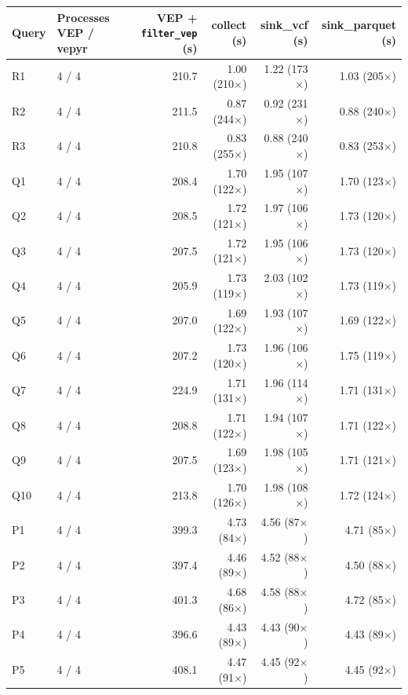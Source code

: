 \begin{tabular}{llrrrr}
\toprule
Query & Processes VEP / vepyr & VEP + \texttt{filter\_vep} (s) & collect (s) & sink\_vcf (s) & sink\_parquet (s) \\
\midrule
R1 & 4 / 4 & 210.7 & 1.00 (210$\times$) & 1.22 (173$\times$) & 1.03 (205$\times$) \\
R2 & 4 / 4 & 211.5 & 0.87 (244$\times$) & 0.92 (231$\times$) & 0.88 (240$\times$) \\
R3 & 4 / 4 & 210.8 & 0.83 (255$\times$) & 0.88 (240$\times$) & 0.83 (253$\times$) \\
Q1 & 4 / 4 & 208.4 & 1.70 (122$\times$) & 1.95 (107$\times$) & 1.70 (123$\times$) \\
Q2 & 4 / 4 & 208.5 & 1.72 (121$\times$) & 1.97 (106$\times$) & 1.73 (120$\times$) \\
Q3 & 4 / 4 & 207.5 & 1.72 (121$\times$) & 1.95 (106$\times$) & 1.73 (120$\times$) \\
Q4 & 4 / 4 & 205.9 & 1.73 (119$\times$) & 2.03 (102$\times$) & 1.73 (119$\times$) \\
Q5 & 4 / 4 & 207.0 & 1.69 (122$\times$) & 1.93 (107$\times$) & 1.69 (122$\times$) \\
Q6 & 4 / 4 & 207.2 & 1.73 (120$\times$) & 1.96 (106$\times$) & 1.75 (119$\times$) \\
Q7 & 4 / 4 & 224.9 & 1.71 (131$\times$) & 1.96 (114$\times$) & 1.71 (131$\times$) \\
Q8 & 4 / 4 & 208.8 & 1.71 (122$\times$) & 1.94 (107$\times$) & 1.71 (122$\times$) \\
Q9 & 4 / 4 & 207.5 & 1.69 (123$\times$) & 1.98 (105$\times$) & 1.71 (121$\times$) \\
Q10 & 4 / 4 & 213.8 & 1.70 (126$\times$) & 1.98 (108$\times$) & 1.72 (124$\times$) \\
P1 & 4 / 4 & 399.3 & 4.73 (84$\times$) & 4.56 (87$\times$) & 4.71 (85$\times$) \\
P2 & 4 / 4 & 397.4 & 4.46 (89$\times$) & 4.52 (88$\times$) & 4.50 (88$\times$) \\
P3 & 4 / 4 & 401.3 & 4.68 (86$\times$) & 4.58 (88$\times$) & 4.72 (85$\times$) \\
P4 & 4 / 4 & 396.6 & 4.43 (89$\times$) & 4.43 (90$\times$) & 4.43 (89$\times$) \\
P5 & 4 / 4 & 408.1 & 4.47 (91$\times$) & 4.45 (92$\times$) & 4.45 (92$\times$) \\
\bottomrule
\end{tabular}
